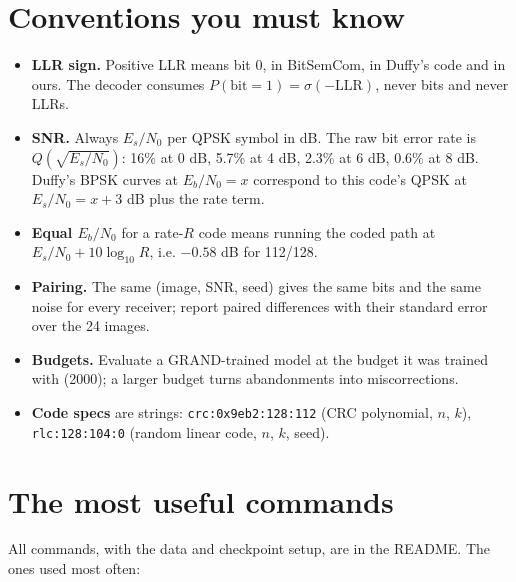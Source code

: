 \documentclass{article}
\begin{document}
\section{Conventions you must know}

\begin{importantnote}[title=Conventions used everywhere in the code]
\begin{itemize}
\item \textbf{LLR sign.} Positive LLR means bit 0, in BitSemCom, in Duffy's code and in ours. The
decoder consumes $P(\text{bit}=1)=\sigma(-\mathrm{LLR})$, never bits and never LLRs.
\item \textbf{SNR.} Always $E_s/N_0$ per QPSK symbol in dB. The raw bit error rate is
$Q(\sqrt{E_s/N_0})$: 16\% at 0 dB, 5.7\% at 4 dB, 2.3\% at 6 dB, 0.6\% at 8 dB. Duffy's BPSK curves at
$E_b/N_0 = x$ correspond to this code's QPSK at $E_s/N_0 = x + 3$ dB plus the rate term.
\item \textbf{Equal $E_b/N_0$} for a rate-$R$ code means running the coded path at
$E_s/N_0 + 10\log_{10} R$, i.e. $-0.58$ dB for 112/128.
\item \textbf{Pairing.} The same (image, SNR, seed) gives the same bits and the same noise for every
receiver; report paired differences with their standard error over the 24 images.
\item \textbf{Budgets.} Evaluate a GRAND-trained model at the budget it was trained with (2000); a
larger budget turns abandonments into miscorrections.
\item \textbf{Code specs} are strings: \texttt{crc:0x9eb2:128:112} (CRC polynomial, $n$, $k$),
\texttt{rlc:128:104:0} (random linear code, $n$, $k$, seed).
\end{itemize}
\end{importantnote}

\section{The most useful commands}

All commands, with the data and checkpoint setup, are in the README. The ones used most often:
\end{document}
